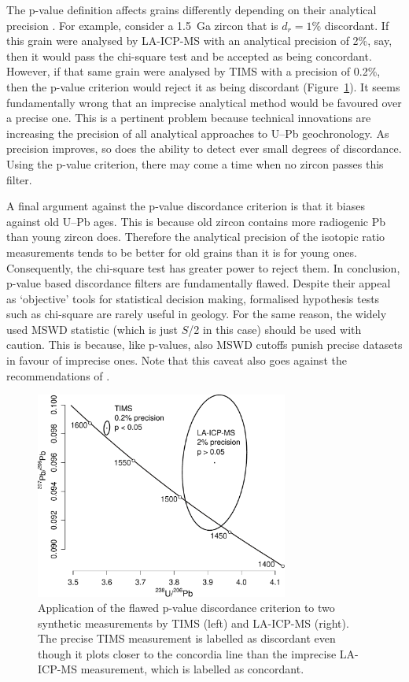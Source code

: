 \documentclass[gchron, manuscript]{copernicus}
\begin{document}
The p-value definition affects grains differently depending on their
analytical precision \citep{nemchin2005}. For example, consider a
1.5~Ga zircon that is $d_r=1\%$ discordant. If this grain were
analysed by LA-ICP-MS with an analytical precision of 2\%, say, then
it would pass the chi-square test and be accepted as being
concordant. However, if that same grain were analysed by TIMS with a
precision of 0.2\%, then the p-value criterion would reject it as
being discordant (Figure~\ref{fig:TIMSvsLAICPMS}). It seems
fundamentally wrong that an imprecise analytical method would be
favoured over a precise one. This is a pertinent problem because
technical innovations are increasing the precision of all analytical
approaches to U--Pb geochronology.  As precision improves, so does the
ability to detect ever small degrees of discordance. Using the p-value
criterion, there may come a time when no zircon passes this filter.

A final argument against the p-value discordance criterion is that it
biases against old U--Pb ages. This is because old zircon contains
more radiogenic Pb than young zircon does. Therefore the analytical
precision of the isotopic ratio measurements tends to be better for
old grains than it is for young ones. Consequently, the chi-square
test has greater power \citep[\emph{sensu}][]{cohen1992} to reject
them. In conclusion, p-value based discordance filters are
fundamentally flawed. Despite their appeal as `objective' tools for
statistical decision making, formalised hypothesis tests such as
chi-square are rarely useful in geology. For the same reason, the
widely used MSWD \citep[Mean Square of the Weighted
  Deviates,][]{mcintyre1966} statistic (which is just $S$/2 in this
case) should be used with caution. This is because, like p-values,
also MSWD cutoffs punish precise datasets in favour of imprecise
ones. Note that this caveat also goes against the recommendations of
\citet{spencer2016}.

\begin{figure}[t]
  \includegraphics[width=8.3cm]{TIMSvsICPMS.pdf}
  \caption{Application of the flawed p-value discordance criterion
    to two synthetic measurements by TIMS (left) and LA-ICP-MS
    (right).  The precise TIMS measurement is labelled as discordant
    even though it plots closer to the concordia line than the
    imprecise LA-ICP-MS measurement, which is labelled as
    concordant.
  }
  \label{fig:TIMSvsLAICPMS}
\end{figure}
\end{document}
